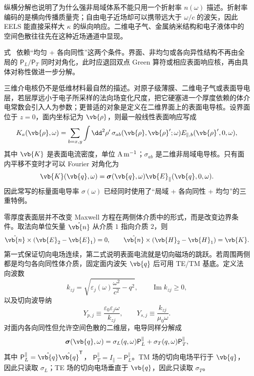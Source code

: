 纵横分解也说明了为什么强非局域体系不能只用一个折射率 $n(\omega)$ 描述。折射率编码的是横向传播质量壳；自由电子近场却可以携带远大于 $\omega/c$ 的波矢，因此 EELS 能直接采样大 $\kappa$ 的纵向响应。二维电子气、金属纳米结构和电子液体中的空间色散往往先在这种近场通道中显现。

式~ 依赖“均匀 + 各向同性”这两个条件。界面、非均匀或各向异性结构不再由全局的 $\mathsf P_L/\mathsf P_T$ 同时对角化，此时应退回双点 Green 算符或相应表面响应核，再由具体对称性做进一步分解。

三维介电核仍不是低维材料最自然的描述。对原子级薄膜、二维电子气或表面导电层，若层厚远小于电子所采样的法向场变化尺度，把它硬塞进一个厚度依赖的体介电常数会引入人为参数；更普适的对象是定义在二维界面上的表面电导核。设界面位于 $z=0$，面内坐标记为 $\vb{\rho}$，则最一般线性表面响应写成
\begin{equation}
{
K_a(\vb{\rho},\omega)
=
\sum_{b=x,y}
\int\dd^2\rho'\,
\sigma_{ab}(\vb{\rho},\vb{\rho}';\omega)
E_{\parallel,b}(\vb{\rho}',0,\omega),}
\label{eq:general_2d_conductivity_kernel}
\end{equation}
其中 $\vb{K}$ 是表面电流密度，单位 ${\rm A\,m^{-1}}$；$\sigma_{ab}$ 是二维非局域电导核。只有面内平移不变时才可以 Fourier 对角化为
\[
\vb{K}(\vb{q},\omega)
=
\boldsymbol\sigma(\vb{q},\omega)
\vb{E}_\parallel(\vb{q},0,\omega).
\]
因此常写的标量面电导率 $\sigma(\omega)$ 已经同时使用了“局域 + 各向同性 + 均匀”的三重特例。

零厚度表面层并不改变 Maxwell 方程在两侧体介质中的形式，而是改变边界条件。取法向单位矢量 $\hat{\vb{n}}$ 从介质 $1$ 指向介质 $2$，则
\begin{equation}
{
\hat{\vb{n}}\times(\vb{E}_2-\vb{E}_1)=0,
\qquad
\hat{\vb{n}}\times(\vb{H}_2-\vb{H}_1)=\vb{K}.}
\label{eq:conductive_sheet_maxwell_jump}
\end{equation}
第一式保证切向电场连续，第二式说明表面电流就是切向磁场的跳跃。若周围两侧都是均匀各向同性体介质，固定面内波矢 $\vb{q}$ 后可用 TE/TM 基底。定义法向波数
\[
k_{zj}
=
\sqrt{\varepsilon_j(\omega)\frac{\omega^2}{c^2}-q^2},
\qquad
\operatorname{Im}k_{zj}\ge0,
\]
以及切向波导纳
\begin{equation*}
Y_{p,j}
\equiv
\frac{\varepsilon_0\varepsilon_j\omega}{k_{zj}},
\qquad
Y_{s,j}
\equiv
\frac{k_{zj}}{\mu_0\omega}.
\end{equation*}
对面内各向同性但允许空间色散的二维层，电导同样分解成
\begin{equation}
{
\boldsymbol\sigma(\vb{q},\omega)
=
\sigma_L(q,\omega)\mathsf P_L^\parallel
+
\sigma_T(q,\omega)\mathsf P_T^\parallel,}
\label{eq:2d_conductivity_LT_decomposition}
\end{equation}
其中
$\mathsf P_L^\parallel=\hat{\vb{q}}\hat{\vb{q}}^{\mathsf T}$，
$\mathsf P_T^\parallel=I_\parallel-\mathsf P_L^\parallel$。TM 场的切向电场平行于 $\vb{q}$，因此只读取 $\sigma_L$；TE 场的切向电场垂直于 $\vb{q}$，因此只读取 $\sigma_T$。

